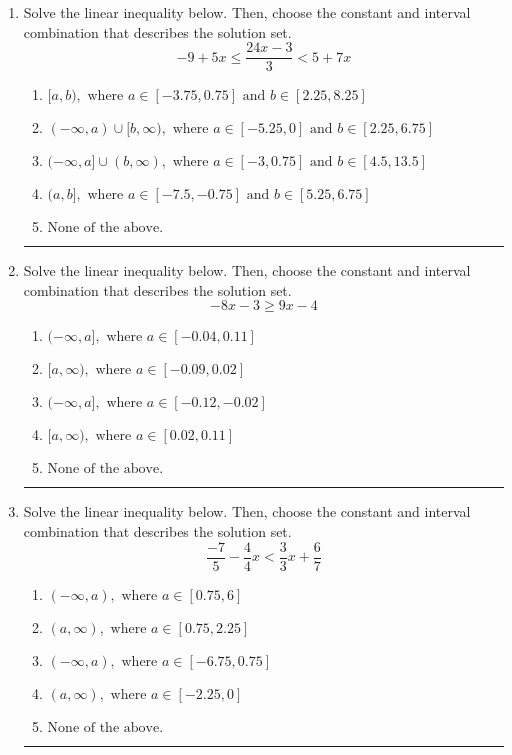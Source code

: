 \documentclass[14pt]{extbook}
\newcommand{\litem}[1]{\item#1\hspace*{-1cm}\rule{\textwidth}{0.4pt}}
\begin{document}
\begin{enumerate}
{\begin{enumerate}[label=\Alph*.]
\end{enumerate} }
\litem{
Solve the linear inequality below. Then, choose the constant and interval combination that describes the solution set.\[ -9 + 5 x \leq \frac{24 x - 3}{3} < 5 + 7 x \]\begin{enumerate}[label=\Alph*.]
\item \( [a, b), \text{ where } a \in [-3.75, 0.75] \text{ and } b \in [2.25, 8.25] \)
\item \( (-\infty, a) \cup [b, \infty), \text{ where } a \in [-5.25, 0] \text{ and } b \in [2.25, 6.75] \)
\item \( (-\infty, a] \cup (b, \infty), \text{ where } a \in [-3, 0.75] \text{ and } b \in [4.5, 13.5] \)
\item \( (a, b], \text{ where } a \in [-7.5, -0.75] \text{ and } b \in [5.25, 6.75] \)
\item \( \text{None of the above.} \)

\end{enumerate} }
\litem{
Solve the linear inequality below. Then, choose the constant and interval combination that describes the solution set.\[ -8x -3 \geq 9x -4 \]\begin{enumerate}[label=\Alph*.]
\item \( (-\infty, a], \text{ where } a \in [-0.04, 0.11] \)
\item \( [a, \infty), \text{ where } a \in [-0.09, 0.02] \)
\item \( (-\infty, a], \text{ where } a \in [-0.12, -0.02] \)
\item \( [a, \infty), \text{ where } a \in [0.02, 0.11] \)
\item \( \text{None of the above}. \)

\end{enumerate} }
\litem{
Solve the linear inequality below. Then, choose the constant and interval combination that describes the solution set.\[ \frac{-7}{5} - \frac{4}{4} x < \frac{3}{3} x + \frac{6}{7} \]\begin{enumerate}[label=\Alph*.]
\item \( (-\infty, a), \text{ where } a \in [0.75, 6] \)
\item \( (a, \infty), \text{ where } a \in [0.75, 2.25] \)
\item \( (-\infty, a), \text{ where } a \in [-6.75, 0.75] \)
\item \( (a, \infty), \text{ where } a \in [-2.25, 0] \)
\item \( \text{None of the above}. \)

\end{enumerate} }
\end{enumerate}
\end{document}
